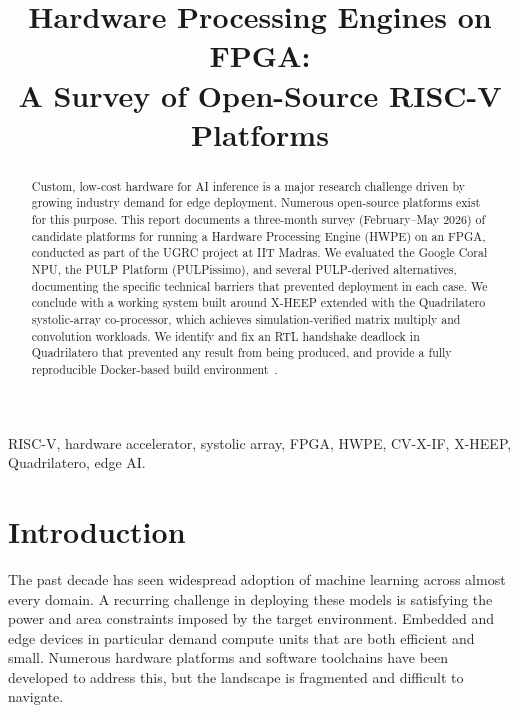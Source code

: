 \documentclass[journal]{IEEEtran}
\begin{document}
\title{Hardware Processing Engines on FPGA:\\
       A Survey of Open-Source RISC-V Platforms}

\author{
}

\maketitle

\begin{abstract}
Custom, low-cost hardware for AI inference is a major research challenge
driven by growing industry demand for edge deployment. Numerous open-source
platforms exist for this purpose. This report documents a three-month survey (February--May 2026)
of candidate platforms for running a Hardware Processing Engine (HWPE) on an
FPGA, conducted as part of the UGRC project at IIT Madras. We evaluated the
Google Coral NPU, the PULP Platform (PULPissimo), and several PULP-derived
alternatives, documenting the specific technical barriers that prevented
deployment in each case. We conclude with a working system built around
X-HEEP extended with the Quadrilatero systolic-array co-processor, which
achieves simulation-verified matrix multiply and convolution workloads. We
identify and fix an RTL handshake deadlock in Quadrilatero that prevented
any result from being produced, and provide a fully reproducible Docker-based
build environment~\cite{quadxheep_repo}.
\end{abstract}

\begin{IEEEkeywords}
RISC-V, hardware accelerator, systolic array, FPGA, HWPE, CV-X-IF,
X-HEEP, Quadrilatero, edge AI.
\end{IEEEkeywords}

\section{Introduction}
\label{sec:intro}
The past decade has seen widespread adoption of machine learning across almost every domain.
A recurring challenge in deploying these models is satisfying the power and area constraints imposed
by the target environment. Embedded and edge devices in particular demand compute units that are both
efficient and small. Numerous hardware platforms and software toolchains have been developed to address this,
but the landscape is fragmented and difficult to navigate.
\end{document}
